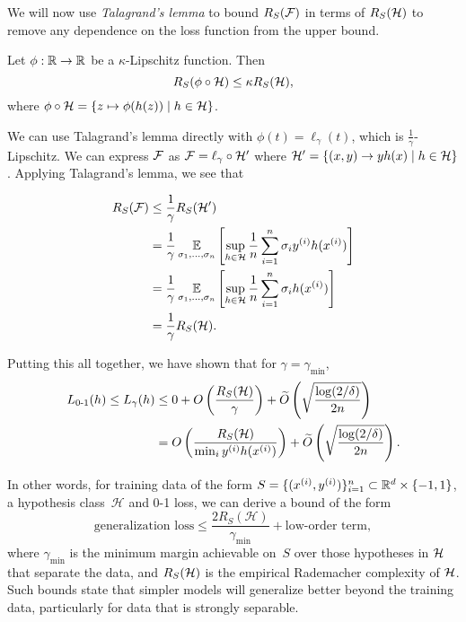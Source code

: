 We will now use \textit{Talagrand's lemma} to bound $R_S(\cF)$ in terms of $R_S(\cH)$ to remove any dependence on the loss function from the upper bound. 
 
\begin{lemma} \label{lec6:lem:talagrand_lemma}
Let $\phi:\R\to\R$ be a $\kappa$-Lipschitz function. Then \begin{equation}
    R_S(\phi\circ \cH)\leq \kappa R_S(\cH),
\end{equation} 
where $\phi\circ\cH = \{z\mapsto \phi(h(z))\mid h\in\cH\}$.
\end{lemma}

We can use Talagrand's lemma directly with $\phi(t) = \ell_\gamma(t)$, which is $\frac{1}{\gamma}$-Lipschitz. We can express $\cF$ as $\cF=\ell_\gamma\circ\cH'$ where $\cH' = \{(x,y)\to yh(x)\mid h\in\cH\}$. Applying Talagrand's lemma, we see that

\begin{align}
R_S(\cF) &\leq \frac{1}{\gamma}R_S(\cH') \\
&= \frac{1}{\gamma}\Exp_{\sigma_1,\dots, \sigma_n} \l[ \sup_{h\in \cH} \frac{1}{n} \sum^n_{i=1} \sigma_i y^{(i)}h(x^{(i)}) \r] \\
&= \frac{1}{\gamma}\Exp_{\sigma_1,\dots, \sigma_n} \l[ \sup_{h\in \cH} \frac{1}{n} \sum^n_{i=1} \sigma_i h(x^{(i)})  \r] \\
&= \frac{1}{\gamma}R_S(\cH).
\end{align}

Putting this all together, we have shown that for $\gamma = \gamma_{\min}$,
\begin{align}
\Err(h) \leq L_\gamma(h) &\leq 0 + O \left( \frac{R_S(\cH)}{\gamma} \right) + \tilO \left( \sqrt{\frac{\log (2 / \delta)}{2n}} \right) \\
&= O \left( \frac{R_S(\cH)}{\min_i y\sp{i} h(x\sp{i}) } \right) + \tilO \left( \sqrt{\frac{\log (2 / \delta)}{2n}} \right).
\end{align}

In other words, for training data of the form $S = \{(x\sp{i},y\sp{i})\}_{i=1}^n \subset \mathbb{R}^d \times \{-1,1\}$, a hypothesis class~$\mathcal{H}$ and 0-1 loss, we can derive a bound of the form
\begin{equation}\label{lec7:eqn:generalization_loss}
    \text{generalization loss} \leq \frac{2R_S(\mathcal{H})}{\gamma_{\mathrm{min}}} + \text{low-order term},
\end{equation}
where $\gamma_\mathrm{min}$ is the minimum margin achievable on~$S$ over those hypotheses in $\cH$ that separate the data, and $R_S(\cH)$ is the empirical Rademacher complexity of $\cH$. Such bounds state that simpler models will generalize better beyond the training data, particularly for data that is strongly separable.

